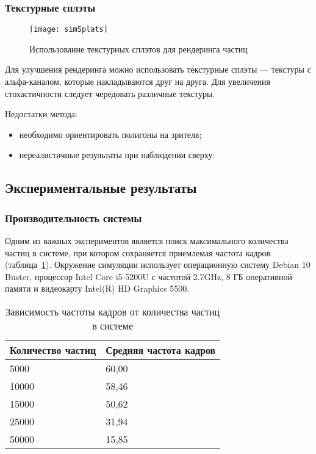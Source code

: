 \begin{frame}[t]
\frametitle{Текстурные сплэты}
\begin{wrapfigure}{r}{0.3\textwidth}
	\centering
    \texttt{[image: simSplats]}
    \caption{Использование текстурных сплэтов для рендеринга частиц}%
    \label{fig:protoSplats}
\end{wrapfigure}
Для улучшения рендеринга можно использовать текстурные сплэты --- текстуры с
альфа-каналом, которые накладываются друг на друга. Для
увеличения стохастичности следует чередовать различные текстуры.

Недостатки метода:
\begin{itemize}
    \item необходимо ориентировать полигоны на зрителя;
    \item нереалистичные результаты при наблюдении сверху.
\end{itemize}
\end{frame}

\subsection{Экспериментальные результаты}
\begin{frame}
\frametitle{Производительность системы}
Одним из важных экспериментов является поиск максимального количества частиц в
системе, при котором сохраняется приемлемая частота кадров
(таблица~\ref{table:amountBench}).
Окружение симуляции использует операционную систему Debian 10 Buster, процессор
Intel Core i5-5200U с частотой 2.7GHz, 8 ГБ оперативной памяти и видеокарту
Intel(R) HD Graphics 5500.
\begin{table}[htb]
\caption{Зависимость частоты кадров от количества частиц в системе}%
\label{table:amountBench}
\centering
\small
\begin{tabular}{| l | l |}
    \hline
    Количество частиц & Средняя частота кадров \\
    \hline
    5000 &  60,00 \\
    \hline
    10000 & 58,46 \\
    \hline
    15000 & 50,62 \\
    \hline
    25000 & 31,94 \\
    \hline
    50000 & 15,85 \\
    \hline
\end{tabular}
\end{table}
\end{frame}

